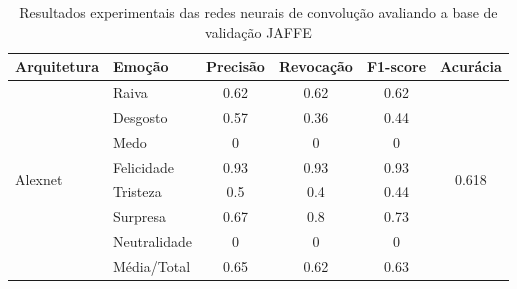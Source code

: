 \begin{table}[]
\centering
\caption{Resultados experimentais das redes neurais de convolução avaliando a base de validação JAFFE}
\label{table:jaffe}
\begin{tabular}{llcccc}
\hline
\textbf{Arquitetura}                   & \textbf{Emoção}       & \multicolumn{1}{l}{\textbf{Precisão}} & \multicolumn{1}{l}{\textbf{Revocação}} & \multicolumn{1}{l}{\textbf{F1-score}} & \multicolumn{1}{l}{\textbf{Acurácia}} \\ \hline
\multirow{8}{*}{Alexnet}         & Raiva                 & 0.62                                  & 0.62                                   & 0.62                                  & \multirow{8}{*}{0.618}                \\
                                       & Desgosto              & 0.57                                  & 0.36                                   & 0.44                                  &                                       \\
                                       & Medo                  & 0                                     & 0                                      & 0                                     &                                       \\
                                       & Felicidade            & 0.93                                  & 0.93                                   & 0.93                                  &                                       \\
                                       & Tristeza              & 0.5                                   & 0.4                                    & 0.44                                  &                                       \\
                                       & Surpresa              & 0.67                                  & 0.8                                    & 0.73                                  &                                       \\
                                       & Neutralidade          & 0                                     & 0                                      & 0                                     &                                       \\
                                       & Média/Total           & 0.65                                  & 0.62                                   & 0.63                                  &                                       \\ \hline

\end{tabular}
\end{table}
